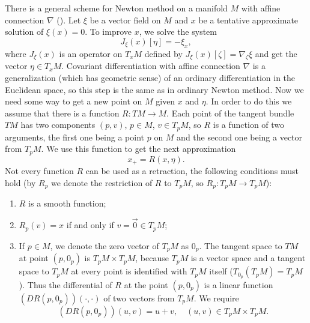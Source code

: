 There is a general scheme for Newton method on a manifold $M$ with affine connection $\nabla$ (\cite{adler_spine}).
Let $\xi$ be a vector field on $M$ and $x$ be a tentative approximate
solution of $\xi(x) = 0$. To improve $x$, we solve the system 
\begin{equation}
    J_{\xi}(x)[\eta] = - \xi_x,
\end{equation}
where $J_{\xi}(x)$ is an operator on $T_xM$ defined by $J_{\xi}(x)[\zeta] = \nabla_{\zeta} \xi$
and get the vector $\eta \in T_xM$. Covariant differentiation with 
affine connection $\nabla$ is a generalization (which has geometric sense) of
an ordinary differentiation in the Euclidean space, so this step is the 
same as in ordinary Newton method. Now we need some way to get 
a new point on $M$ given $x$ and $\eta$. In order to do this we assume
that there is a function $R \colon TM \to M$. Each point of the tangent bundle $TM$
has two components $(p, v)$, $p \in M$, $v \in T_pM$, so $R$ is a function
of two arguments, the first one being a point $p$ on $M$
and the second one being a vector from $T_pM$. We use this function
to get the next approximation
\begin{equation}
    x_{+} = R(x, \eta).
\end{equation}
Not every function $R$ can be used as a retraction, the following 
conditions must hold (by $R_p$ we denote the restriction of $R$ to $T_pM$,  so $R_p \colon T_pM \to T_pM$):
\begin{enumerate}
    \item $R$ is a smooth function;
    \item $R_p(v) = x$ if and only if $v = \vec{0} \in T_pM$;

    \item If $p \in M$, we denote the zero vector of $T_pM$ as $0_p$. The tangent space to $TM$ at point $(p, 0_p)$
        is $T_pM \times T_pM$, because $T_pM$ is a vector space and a tangent space to $T_pM$
        at every point is identified with $T_pM$ itself ($T_{0_p}(T_pM) = T_pM$). Thus the
        differential of $R$ at the point $(p, 0_p)$ is a linear function $(DR(p, 0_p))(\cdot, \cdot)$
        of two vectors from $T_pM$. We require
        \begin{equation}
          (DR(p, 0_p))(u, v) = u + v, \quad (u, v) \in T_pM \times T_pM.
        \end{equation}
\end{enumerate}


